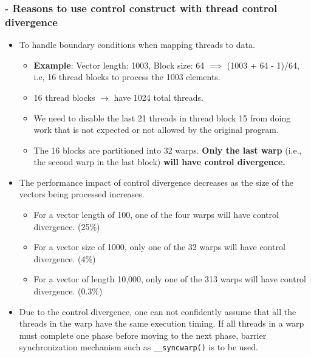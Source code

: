 \subsubsection{- Reasons to use control construct with thread control divergence}
\begin{itemize}
    \item To handle boundary conditions when mapping threads to data.
          \begin{itemize}

              \item \textbf{Example}: Vector length: 1003, Block size: 64 $\implies$ (1003 + 64 - 1)/64, i.e, 16 thread blocks to process the 1003 elements.
              \item 16 thread blocks $\rightarrow$ have 1024 total threads.
              \item We need to disable the last 21 threads in thread block 15 from doing work that is not expected or not allowed by the original program.
              \item The 16 blocks are partitioned into 32 warps. \textbf{Only the last warp} (i.e., the second warp in the last block) \textbf{will have control divergence.}
          \end{itemize}
    \item The performance impact of control divergence decreases as the size of the vectors being processed increases.
          \begin{itemize}
              \item For a vector length of 100, one of the four warps will have control divergence. (25\%)
              \item For a vector size of 1000, only one of the 32 warps will have control divergence. (4\%)
              \item For a vector of length 10,000, only one of the 313 warps will have control divergence. (0.3\%)
          \end{itemize}
    \item Due to the control divergence, one can not confidently assume that all the threads in the warp have the same execution timing. If all threads in a warp must complete one phase before moving to the next phase, barrier synchronization mechanism such as \texttt{\_\_syncwarp()} is to be used.
\end{itemize}

